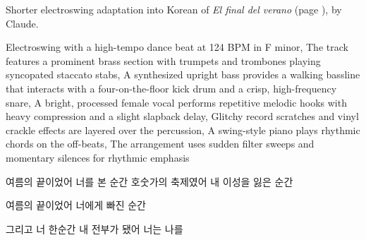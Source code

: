 
\begin{notes}
Shorter electroswing adaptation into Korean of \emph{El final del verano} (page \pageref{sec:verano}), by Claude.
\end{notes}
\begin{style}
Electroswing with a high-tempo dance beat at 124 BPM in F minor, The track features a prominent brass section with trumpets and trombones playing syncopated staccato stabs, A synthesized upright bass provides a walking bassline that interacts with a four-on-the-floor kick drum and a crisp, high-frequency snare, A bright, processed female vocal performs repetitive melodic hooks with heavy compression and a slight slapback delay, Glitchy record scratches and vinyl crackle effects are layered over the percussion, A swing-style piano plays rhythmic chords on the off-beats, The arrangement uses sudden filter sweeps and momentary silences for rhythmic emphasis
\end{style}
\begin{lyrics}
여름의 끝이었어
너를 본 순간
호숫가의 축제였어
내 이성을 잃은 순간

여름의 끝이었어
너에게 빠진 순간

그리고 너 
한순간 내 전부가 됐어
너는 나를
\end{lyrics}

